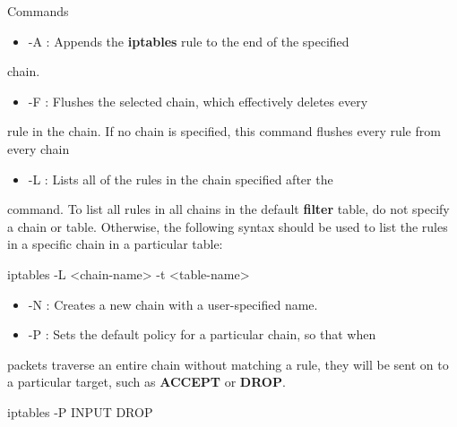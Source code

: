 \begin{frame}[t,allowframebreaks]{Commands}
  \fontsize{15}{18}\selectfont
  \begin{itemize}
    \item -A : Appends the \textcolor{CommandGreen}{\bfseries iptables} rule to the end of the specified
  \end{itemize}
  chain.\par
  \begin{itemize}
    \item -F : Flushes the selected chain, which effectively deletes every
  \end{itemize}
  rule in the chain. If no chain is specified, this command flushes every rule from every chain\par
  \begin{itemize}
    \item -L : Lists all of the rules in the chain specified after the
  \end{itemize}
  command. To list all rules in all chains in the default \textcolor{CommandGreen}{\bfseries filter} table, do not specify a chain or table. Otherwise, the following syntax should be used to list the rules in a specific chain in a particular table:\par
  \vspace{0.08cm}
  {\color{CommandGreen}\ttfamily\fontsize{13.5}{16.5}\selectfont iptables -L <chain-name> -t <table-name>\par}
  \begin{itemize}
    \item -N : Creates a new chain with a user-specified name.
    \item -P : Sets the default policy for a particular chain, so that when
  \end{itemize}
  packets traverse an entire chain without matching a rule, they will be sent on to a particular target, such as \textcolor{WarningColor}{\bfseries ACCEPT} or \textcolor{WarningColor}{\bfseries DROP}.\par
  \vspace{0.08cm}
  {\color{CommandGreen}\ttfamily\fontsize{13.5}{16.5}\selectfont iptables -P INPUT DROP\par}
\end{frame}
